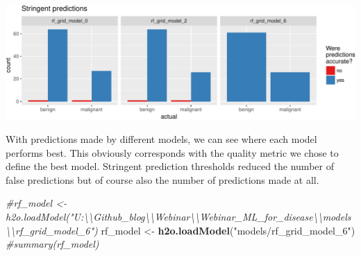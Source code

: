 \documentclass[]{article}
\newenvironment{Shaded}{\begin{snugshade}}{\end{snugshade}}
\newcommand{\KeywordTok}[1]{\textcolor[rgb]{0.13,0.29,0.53}{\textbf{{#1}}}}
\newcommand{\DataTypeTok}[1]{\textcolor[rgb]{0.13,0.29,0.53}{{#1}}}
\newcommand{\DecValTok}[1]{\textcolor[rgb]{0.00,0.00,0.81}{{#1}}}
\newcommand{\CharTok}[1]{\textcolor[rgb]{0.31,0.60,0.02}{{#1}}}
\newcommand{\StringTok}[1]{\textcolor[rgb]{0.31,0.60,0.02}{{#1}}}
\newcommand{\CommentTok}[1]{\textcolor[rgb]{0.56,0.35,0.01}{\textit{{#1}}}}
\newcommand{\NormalTok}[1]{{#1}}
\begin{document}
\begin{Shaded}
\end{Shaded}

\includegraphics{webinar_code_files/figure-latex/final_predictions_rf-2.pdf}

With predictions made by different models, we can see where each model
performs best. This obviously corresponds with the quality metric we
chose to define the best model. Stringent prediction thresholds reduced
the number of false predictions but of course also the number of
predictions made at all.

\begin{Shaded}
\begin{Highlighting}[]
\CommentTok{#rf_model <- h2o.loadModel("U:\textbackslash{}\textbackslash{}Github_blog\textbackslash{}\textbackslash{}Webinar\textbackslash{}\textbackslash{}Webinar_ML_for_disease\textbackslash{}\textbackslash{}models\textbackslash{}\textbackslash{}rf_grid_model_6")}
\NormalTok{rf_model <-}\StringTok{ }\KeywordTok{h2o.loadModel}\NormalTok{(}\StringTok{"models/rf_grid_model_6"}\NormalTok{)}
\CommentTok{#summary(rf_model)}
\end{Highlighting}
\end{Shaded}
\end{document}
